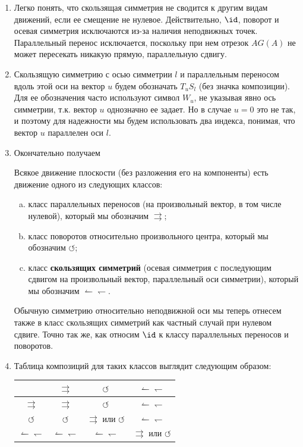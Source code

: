 \begin{enumerate}
\item Легко понять, что скользящая симметрия не сводится к другим видам движений, если ее смещение не нулевое. Действительно, $\id$, поворот и осевая симметрия исключаются из-за наличия неподвижных точек. Параллельный перенос исключается, поскольку при нем отрезок $AG(A)$ не может пересекать никакую прямую, параллельную сдвигу.

\item Скользящую симметрию с осью симметрии $l$ и параллельным переносом вдоль этой оси на вектор $u$ будем обозначать $T_uS_l$ (без значка композиции). Для ее обозначения часто используют символ $W_u$, не указывая явно ось симметрии, т.к. вектор $u$ однозначно ее задает. Но в случае $u=0$ это не так, и поэтому для надежности мы будем использовать два индекса, понимая, что вектор $u$ параллелен оси $l$.

\item Окончательно получаем
\begin{thrm}[Шаля] Всякое движение плоскости (без разложения его на компоненты) есть движение одного из следующих классов:
\begin{enumerate}[a)]
\item класс параллельных переносов (на произвольный вектор, в том числе нулевой), который мы обозначим $\rightrightarrows$;
\item класс поворотов относительно произвольного центра, который мы обозначим $\circlearrowleft$;
\item класс \textbf{скользящих симметрий} (осевая симметрия с последующим сдвигом на произвольный вектор, параллельный оси симметрии), который мы обозначим $\leftharpoonup\leftharpoondown$.
\end{enumerate}
\end{thrm}
Обычную симметрию относительно неподвижной оси мы теперь отнесем также в класс скользящих симметрий как частный случай при нулевом сдвиге. Точно так же, как относим $\id$ к классу параллельных переносов и поворотов.



\item Таблица композиций для таких классов выглядит следующим образом:
\begin{center}
\begin{tabular}{c|ccc}
 & $\rightrightarrows$ & $\circlearrowleft$ &  $\leftharpoonup\leftharpoondown$ \\ \hline
$\rightrightarrows$ & $\rightrightarrows$ &  $\circlearrowleft$ &  $\leftharpoonup\leftharpoondown$  \\ 
$\circlearrowleft$ & $\circlearrowleft$ & $\rightrightarrows$ или $\circlearrowleft$ & $\leftharpoonup\leftharpoondown$  \\ 
$\leftharpoonup\leftharpoondown$ & $\leftharpoonup\leftharpoondown$ & $\leftharpoonup\leftharpoondown$ & $\rightrightarrows$ или $\circlearrowleft$  \\ 
\end{tabular}
\end{center}


\end{enumerate}

